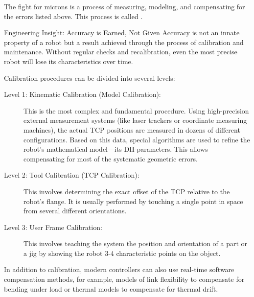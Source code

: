 The fight for microns is a process of measuring, modeling, and compensating for the errors listed above. This process is called .

\begin{tipbox}{Engineering Insight: Accuracy is Earned, Not Given}
Accuracy is not an innate property of a robot but a result achieved through the process of calibration and maintenance. Without regular checks and recalibration, even the most precise robot will lose its characteristics over time.
\end{tipbox}

Calibration procedures can be divided into several levels:
\begin{description}
    \item[Level 1: Kinematic Calibration (Model Calibration):] This is the most complex and fundamental procedure. Using high-precision external measurement systems (like laser trackers or coordinate measuring machines), the actual TCP positions are measured in dozens of different configurations. Based on this data, special algorithms are used to refine the robot's mathematical model—its DH-parameters. This allows compensating for most of the systematic geometric errors.
    
    \item[Level 2: Tool Calibration (TCP Calibration):] This involves determining the exact offset of the TCP relative to the robot's flange. It is usually performed by touching a single point in space from several different orientations.
    
    \item[Level 3: User Frame Calibration:] This involves teaching the system the position and orientation of a part or a jig by showing the robot 3-4 characteristic points on the object.
\end{description}

In addition to calibration, modern controllers can also use real-time software compensation methods, for example, models of link flexibility to compensate for bending under load or thermal models to compensate for thermal drift.